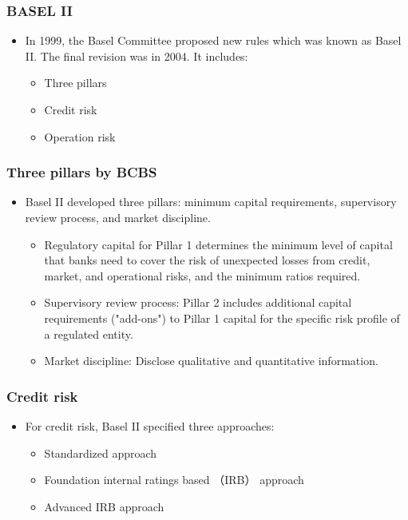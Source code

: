 \subsubsection{BASEL II}
\begin{itemize}
\item In 1999, the Basel Committee proposed new rules which was known as Basel II. The final revision was in 2004. It includes:
    \begin{itemize}
    \item Three pillars
    \item Credit risk
    \item Operation risk
    \end{itemize}
\end{itemize}


\subsubsection{Three pillars by BCBS}
\begin{itemize}
\item Basel II developed three pillars: minimum capital requirements, supervisory review process, and market discipline.
    \begin{itemize}
    \item Regulatory capital for Pillar 1 determines the minimum level of capital that banks need to cover the risk of unexpected losses from credit, market, and operational risks, and the minimum ratios required.
    \item Supervisory review process: Pillar 2 includes additional capital requirements ("add-ons") to Pillar 1 capital for the specific risk profile of a regulated entity.
    \item Market discipline: Disclose qualitative and quantitative information.
    \end{itemize}
\end{itemize}


\subsubsection{Credit risk}
\begin{itemize}
\item For credit risk, Basel II specified three approaches:
    \begin{itemize}
    \item Standardized approach
    \item Foundation internal ratings based （IRB） approach
    \item Advanced IRB approach
    \end{itemize}
\end{itemize}


